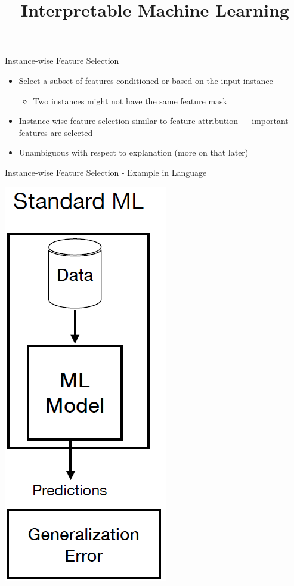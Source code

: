 \documentclass[11pt,compress,t,notes=noshow, aspectratio=169, xcolor=table]{beamer}
\title{Interpretable Machine Learning}
\date{}
\begin{document}
	\graphicspath{ {./figure/} }

\newcommand{\titlefigure}{figure/bild9}
\newcommand{\learninggoals}{
\item Instance-wise feature selection
\item Explain then predict models
\item Optimizing using explanation data}


 
\begin{frame}{Instance-wise Feature Selection}
\begin{itemize}
    \item Select a subset of features conditioned or based on the input instance
    \begin{itemize}
        \item Two instances might not have the same feature mask
    \end{itemize}
    \bigskip
    \item Instance-wise feature selection similar to feature attribution — important features are
selected
\item Unambiguous with respect to explanation (more on that later)
\end{itemize}
    
\end{frame}

\begin{frame}{Instance-wise Feature Selection - Example in Language}


\centerline{\includegraphics[width=0.15\linewidth,left]{bild5}}

\end{frame}
\end{document}

